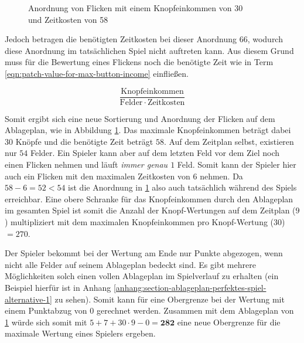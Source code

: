 \begin{figure}[!ht]
\begin{minipage}{.48\textwidth}
        \captionsetup{format=plain, singlelinecheck=false}
        \setcapindent{0pt}
        \caption[Anordnung von Flicken mit Zeitkosten von 58]{Anordnung von Flicken mit einem Knopfeinkommen von 30 \\ und Zeitkosten von 58}
        \label{fig:quilt-board-real-max-button-income}
    \end{minipage}
\end{figure}

Jedoch betragen die benötigten Zeitkosten bei dieser Anordnung $66$, wodurch diese Anordnung im tatsächlichen Spiel nicht auftreten kann. Aus diesem Grund muss für die Bewertung eines Flickens noch die benötigte Zeit wie in Term \ref{eqn:patch-value-for-max-button-income} einfließen.

\begin{equation}
    \label{eqn:patch-value-for-max-button-income}
    \frac{\text{Knopfeinkommen}}{\text{Felder}\, \cdot\, \text{Zeitkosten}}
\end{equation}

Somit ergibt sich eine neue Sortierung und Anordnung der Flicken auf dem Ablageplan, wie in Abbildung \ref{fig:quilt-board-real-max-button-income}. Das maximale Knopfeinkommen beträgt dabei $30$ Knöpfe und die benötigte Zeit beträgt $58$. Auf dem Zeitplan selbst, existieren nur $54$ Felder. Ein Spieler kann aber auf dem letzten Feld vor dem Ziel noch einen Flicken nehmen und läuft \emph{immer genau $1$} Feld. Somit kann der Spieler hier auch ein Flicken mit den maximalen Zeitkosten von $6$ nehmen. Da $58 - 6 = 52 < 54$ ist die Anordnung in \ref{fig:quilt-board-real-max-button-income} also auch tatsächlich während des Spiels erreichbar. Eine obere Schranke für das Knopfeinkommen durch den Ablageplan im gesamten Spiel ist somit die Anzahl der Knopf-Wertungen auf dem Zeitplan ($9$) multipliziert mit dem maximalen Knopfeinkommen pro Knopf-Wertung ($30$) $= 270$.

Der Spieler bekommt bei der Wertung am Ende nur Punkte abgezogen, wenn nicht alle Felder auf seinem Ablageplan bedeckt sind. Es gibt mehrere Möglichkeiten solch einen vollen Ablageplan im Spielverlauf zu erhalten (ein Beispiel hierfür ist in Anhang \ref{anhang:section-ablageplan-perfektes-spiel-alternative-1} zu sehen). Somit kann für eine Obergrenze bei der Wertung mit einem Punktabzug von 0 gerechnet werden. Zusammen mit dem Ablageplan von \ref{fig:quilt-board-real-max-button-income} würde sich somit mit $5 + 7 + 30 \cdot 9 - 0 = \boldsymbol{282}$ eine neue Obergrenze für die maximale Wertung eines Spielers ergeben.

